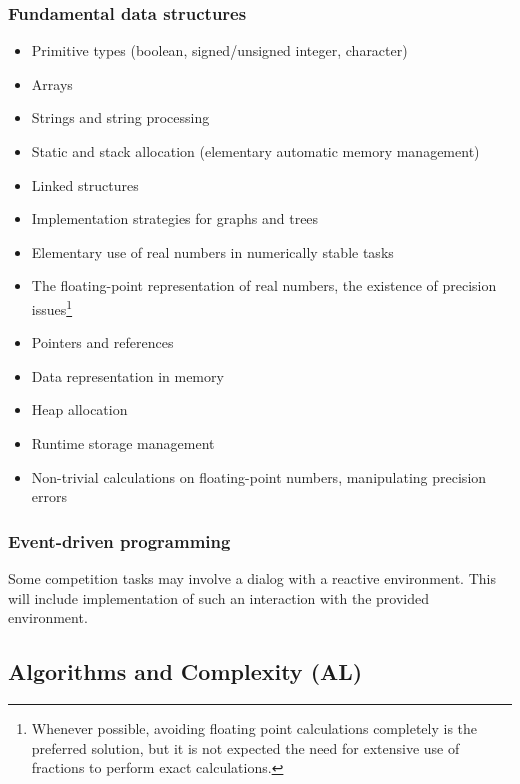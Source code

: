 \documentclass[12pt]{article}
\begin{document}
		\subsubsection{Fundamental data structures}
		\begin{itemize}[label=]
			\item Primitive types (boolean, signed/unsigned integer, character)
			\item Arrays
			\item Strings and string processing
			\item Static and stack allocation (elementary automatic memory management)
			\item Linked structures
			\item Implementation strategies for graphs and trees
			\item Elementary use of real numbers in numerically stable tasks
			\item The floating-point representation of real numbers, the existence of precision issues\footnote{Whenever possible, avoiding floating point calculations completely is the preferred solution, but it is not expected the need for extensive use of fractions to perform exact calculations.}
			\item Pointers and references
			\item Data representation in memory
		\end{itemize}
		
		\begin{itemize}[label=]
			\item Heap allocation
			\item Runtime storage management
			\item Non-trivial calculations on floating-point numbers, manipulating precision errors
		\end{itemize}
		
		\subsubsection{Event-driven programming}
		Some competition tasks may involve a dialog with a reactive environment. This will include implementation of such an interaction with the provided environment.
		
	\subsection{Algorithms and Complexity (AL)}
		\renewcommand{\type}{AL}
\end{document}
